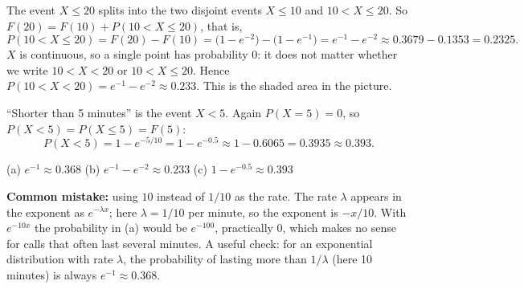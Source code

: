 \begin{solution}
	 The event $X\le20$ splits into the two disjoint events
	$X\le10$ and $10<X\le20$. So $F(20)=F(10)+P(10<X\le20)$, that is,
	\[
		P(10<X\le20)=F(20)-F(10)
		=\big(1-e^{-2}\big)-\big(1-e^{-1}\big)
		=e^{-1}-e^{-2}\approx0.3679-0.1353=0.2325.
	\]
	$X$ is continuous, so a single point has probability $0$: it does not
	matter whether we write $10<X<20$ or $10<X\le20$. Hence
	$P(10<X<20)=e^{-1}-e^{-2}\approx0.233$.
	This is the shaded area in the picture.

	 ``Shorter than 5 minutes'' is the event $X<5$. Again
	$P(X=5)=0$, so $P(X<5)=P(X\le5)=F(5)$:
	\[
		P(X<5)=1-e^{-5/10}=1-e^{-0.5}\approx1-0.6065=0.3935\approx0.393.
	\]

	\begin{answer}
		(a) $e^{-1}\approx0.368$ \quad
		(b) $e^{-1}-e^{-2}\approx0.233$ \quad
		(c) $1-e^{-0.5}\approx0.393$
	\end{answer}
	\begin{remark}
		\textbf{Common mistake:} using $10$ instead of $1/10$ as the
		rate. The rate $\lambda$ appears in the exponent as $e^{-\lambda x}$;
		here $\lambda=1/10$ per minute, so the exponent is $-x/10$. With
		$e^{-10x}$ the probability in (a) would be $e^{-100}$, practically
		$0$, which makes no sense for calls that often last several minutes.
		A useful check: for an exponential distribution with rate $\lambda$,
		the probability of lasting more than $1/\lambda$ (here 10 minutes) is
		always $e^{-1}\approx0.368$.
	\end{remark}
\end{solution}
